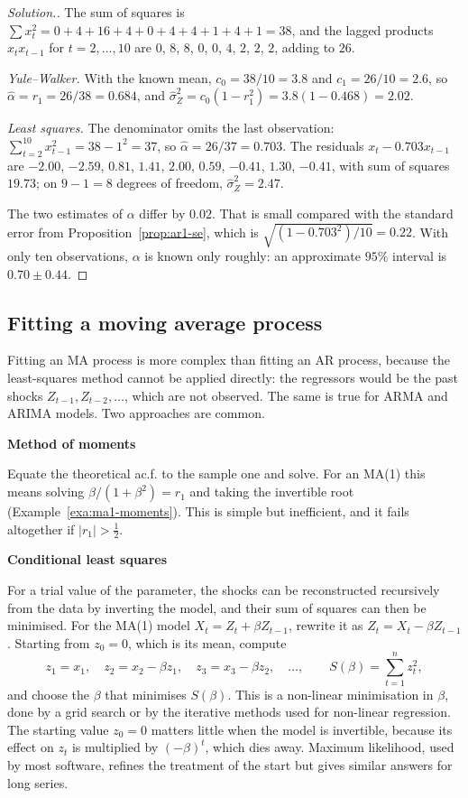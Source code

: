 \documentclass[11pt,a4paper]{article}
\theoremstyle{definition}
\newenvironment{solution}
  {\renewcommand{\qedsymbol}{}\begin{proof}[\textit{Solution}.]}
  {\end{proof}}
\newcommand{\subhead}[1]{%
  \par\medskip\noindent\textbf{#1}\par\nobreak\smallskip}
\begin{document}
\begin{solution}
The sum of squares is $\sum x_t^2 = 0 + 4 + 16 + 4 + 0 + 4 + 4 + 1 + 4 + 1 = 38$, and the lagged products $x_tx_{t-1}$ for $t = 2, \dots, 10$ are
$0$, $8$, $8$, $0$, $0$, $4$, $2$, $2$, $2$, adding to $26$.

\emph{Yule--Walker.} With the known mean, $c_0 = 38/10 = 3.8$ and $c_1 = 26/10 = 2.6$, so $\hat\alpha = r_1 = 26/38 = 0.684$, and
$\hat\sigma_Z^2 = c_0(1 - r_1^2) = 3.8(1 - 0.468) = 2.02$.

\emph{Least squares.} The denominator omits the last observation: $\sum_{t=2}^{10}x_{t-1}^2 = 38 - 1^2 = 37$, so $\hat\alpha = 26/37 = 0.703$.
The residuals $x_t - 0.703x_{t-1}$ are $-2.00$, $-2.59$, $0.81$, $1.41$, $2.00$, $0.59$, $-0.41$, $1.30$, $-0.41$, with sum of squares $19.73$; on $9 - 1 = 8$ degrees of freedom,
$\hat\sigma_Z^2 = 2.47$.

The two estimates of $\alpha$ differ by $0.02$. That is small compared with the standard error from
Proposition~\ref{prop:ar1-se}, which is $\sqrt{(1 - 0.703^2)/10} = 0.22$. With only ten observations, $\alpha$ is known only roughly: an approximate $95\%$ interval is $0.70 \pm 0.44$.
\end{solution}

\subsection{Fitting a moving average process}
Fitting an MA process is more complex than fitting an AR process, because the least-squares method cannot be
applied directly: the regressors would be the past shocks $Z_{t-1}, Z_{t-2}, \dots$, which are not observed. The same is true for
ARMA and ARIMA models. Two approaches are common.

\subhead{Method of moments}
Equate the theoretical ac.f. to the sample one and solve. For an MA(1) this means solving $\beta/(1 + \beta^2) = r_1$ and taking the
invertible root (Example~\ref{exa:ma1-moments}). This is simple but inefficient, and it fails altogether if $|r_1| > \frac12$.

\subhead{Conditional least squares}
For a trial value of the parameter, the shocks can be reconstructed recursively from the data by inverting
the model, and their sum of squares can then be minimised. For the MA(1) model $X_t = Z_t + \beta Z_{t-1}$, rewrite it as
$Z_t = X_t - \beta Z_{t-1}$. Starting from $z_0 = 0$, which is its mean, compute
\[
z_1 = x_1 , \quad z_2 = x_2 - \beta z_1 , \quad z_3 = x_3 - \beta z_2 , \quad \dots , \qquad S(\beta) = \sum_{t=1}^nz_t^2 ,
\]
and choose the $\beta$ that minimises $S(\beta)$. This is a non-linear minimisation in $\beta$, done by a grid search or by the
iterative methods used for non-linear regression. The starting value $z_0 = 0$ matters little when the model is invertible,
because its effect on $z_t$ is multiplied by $(-\beta)^t$, which dies away. Maximum likelihood, used by most software, refines the
treatment of the start but gives similar answers for long series.
\end{document}
